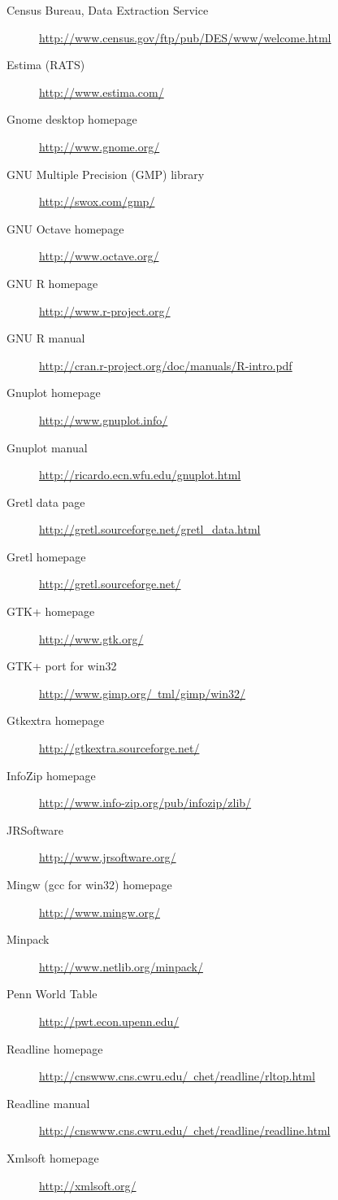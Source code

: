 \begin{description}

\item[Census Bureau, Data Extraction Service]
  \href{http://www.census.gov/ftp/pub/DES/www/welcome.html}{
    http://www.census.gov/ftp/pub/DES/www/welcome.html}
\item[Estima (RATS)] \href{http://www.estima.com/}{
    http://www.estima.com/}
\item[Gnome desktop homepage] \href{http://www.gnome.org/}{
    http://www.gnome.org/}
\item[GNU Multiple Precision (GMP) library]
  \href{http://swox.com/gmp/}{ http://swox.com/gmp/}
\item[GNU Octave homepage] \href{http://www.octave.org/}{
    http://www.octave.org/}
\item[GNU R homepage] \href{http://www.r-project.org/}{
    http://www.r-project.org/}
\item[GNU R manual]
  \href{http://cran.r-project.org/doc/manuals/R-intro.pdf}{
    http://cran.r-project.org/doc/manuals/R-intro.pdf}
\item[Gnuplot homepage] \href{http://www.gnuplot.info/}{
    http://www.gnuplot.info/}
\item[Gnuplot manual] \href{http://ricardo.ecn.wfu.edu/gnuplot.html}{
    http://ricardo.ecn.wfu.edu/gnuplot.html}
\item[Gretl data page]
  \url{http://gretl.sourceforge.net/gretl_data.html}
\item[Gretl homepage] \href{http://gretl.sourceforge.net/}{
    http://gretl.sourceforge.net/}
\item[GTK+ homepage] \href{http://www.gtk.org/}{ http://www.gtk.org/}
\item[GTK+ port for win32]
  \href{http://user.sgic.fi/~tml/gimp/win32/}{
    http://www.gimp.org/~tml/gimp/win32/}
\item[Gtkextra homepage] \href{http://gtkextra.sourceforge.net/}{
    http://gtkextra.sourceforge.net/}
\item[InfoZip homepage]
  \href{http://www.info-zip.org/pub/infozip/zlib/}{
    http://www.info-zip.org/pub/infozip/zlib/}
\item[JRSoftware] \href{http://www.jrsoftware.org/}{
    http://www.jrsoftware.org/}
\item[Mingw (gcc for win32) homepage] \href{http://www.mingw.org/}{
    http://www.mingw.org/}
\item[Minpack] \href{http://www.netlib.org/minpack/}{
    http://www.netlib.org/minpack/}
\item[Penn World Table] \href{http://pwt.econ.upenn.edu/}{
    http://pwt.econ.upenn.edu/}
\item[Readline homepage]
  \href{http://cnswww.cns.cwru.edu/~chet/readline/rltop.html}{
    http://cnswww.cns.cwru.edu/~chet/readline/rltop.html}
\item[Readline manual]
  \href{http://cnswww.cns.cwru.edu/~chet/readline/readline.html}{
    http://cnswww.cns.cwru.edu/~chet/readline/readline.html}
\item[Xmlsoft homepage] \href{http://xmlsoft.org/}{
    http://xmlsoft.org/}

\end{description}




